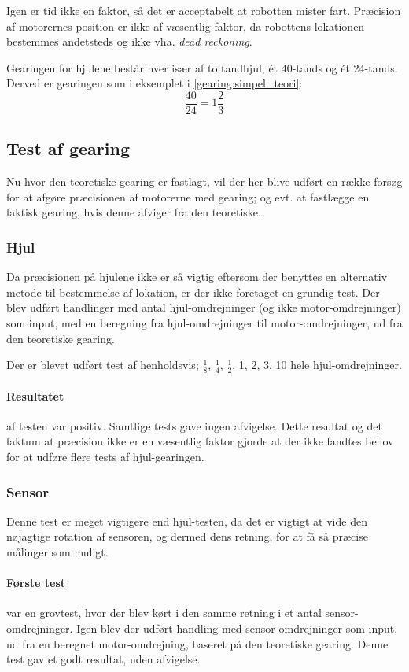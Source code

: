 Igen er tid ikke en faktor, så det er acceptabelt at robotten mister fart.
Præcision af motorernes position er ikke af væsentlig faktor, da robottens lokationen bestemmes andetsteds og ikke vha. \textit{dead reckoning}.

Gearingen for hjulene består hver især af to tandhjul; ét 40-tands og ét 24-tands.
Derved er gearingen som i eksemplet i \cref{gearing:simpel_teori}: $$ \frac{40}{24} = 1 \frac{2}{3} $$

\subsection{Test af gearing}\label{robot:gearing-test}
Nu hvor den teoretiske gearing er fastlagt, vil der her blive udført en række forsøg for at afgøre præcisionen af motorerne med gearing; og evt. at fastlægge en faktisk gearing, hvis denne afviger fra den teoretiske.

\subsubsection{Hjul}
Da præcisionen på hjulene ikke er så vigtig eftersom der benyttes en alternativ metode til bestemmelse af lokation, er der ikke foretaget en grundig test.
Der blev udført handlinger med antal hjul-omdrejninger (og ikke motor-omdrejninger) som input, med en beregning fra hjul-omdrejninger til motor-omdrejninger, ud fra den teoretiske gearing.

Der er blevet udført test af henholdsvis; $\frac{1}{8}$, $\frac{1}{4}$, $\frac{1}{2}$, 1, 2, 3, 10 hele hjul-omdrejninger.

\paragraph{Resultatet} af testen var positiv.
Samtlige tests gave ingen afvigelse.
Dette resultat og det faktum at præcision ikke er en væsentlig faktor gjorde at der ikke fandtes behov for at udføre flere tests af hjul-gearingen.

\subsubsection{Sensor}
Denne test er meget vigtigere end hjul-testen, da det er vigtigt at vide den nøjagtige rotation af sensoren, og dermed dens retning, for at få så præcise målinger som muligt.

\paragraph{Første test} var en grovtest, hvor der blev kørt i den samme retning i et antal sensor-omdrejninger.
Igen blev der udført handling med sensor-omdrejninger som input, ud fra en beregnet motor-omdrejning, baseret på den teoretiske gearing.
Denne test gav et godt resultat, uden afvigelse.

